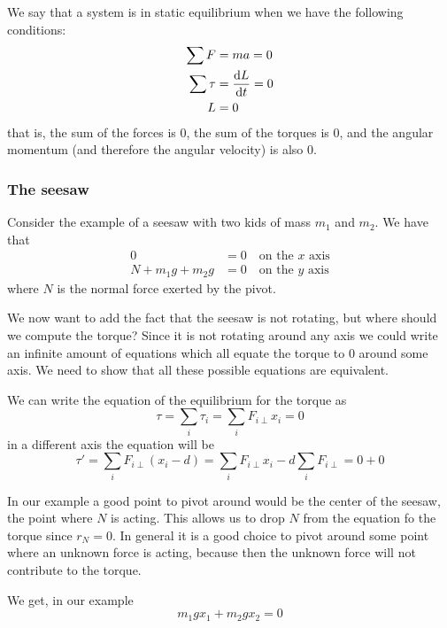 \documentclass[12pt]{extarticle}
\begin{document}
We say that a system is in static equilibrium when we have the following conditions:
\begin{align}
    \sum F    & = ma = 0        \\
    \sum \tau & = \dv{L}{t} = 0 \\
    L         & = 0
\end{align}
that is, the sum of the forces is $0$, the sum of the torques is $0$, and the angular momentum (and therefore the angular velocity) is also $0$.

\subsubsection{The seesaw}

Consider the example of a seesaw with two kids of mass $m_1$ and $m_2$.
We have that
\begin{align}
    0                 & = 0 \quad \text{on the $x$ axis} \\
    N + m_1 g + m_2 g & = 0 \quad \text{on the $y$ axis}
\end{align}
where $N$ is the normal force exerted by the pivot.

We now want to add the fact that the seesaw is not rotating, but where should we compute the torque?
Since it is not rotating around any axis we could write an infinite amount of equations which all equate the torque to $0$ around some axis.
We need to show that all these possible equations are equivalent.

We can write the equation of the equilibrium for the torque as
\begin{equation}
    \tau = \sum_i \tau_i = \sum_i F_{i \perp} x_i = 0
\end{equation}
in a different axis the equation will be
\begin{equation}
    \tau' = \sum_i F_{i \perp} (x_i - d) = \sum_i F_{i \perp} x_i - d \sum_i F_{i \perp} = 0 + 0
\end{equation}

In our example a good point to pivot around would be the center of the seesaw, the point where $N$ is acting.
This allows us to drop $N$ from the equation fo the torque since $r_N = 0$.
In general it is a good choice to pivot around some point where an unknown force is acting, because then the unknown force will not contribute to the torque.

We get, in our example
\begin{equation}
    m_1 g x_1 + m_2 g x_2 = 0
\end{equation}
\end{document}
